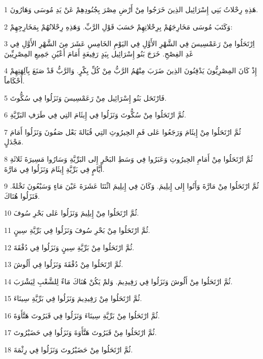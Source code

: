 \par 1 هَذِهِ رِحْلاتُ بَنِي إِسْرَائِيل الذِينَ خَرَجُوا مِنْ أَرْضِ مِصْرَ بِجُنُودِهِمْ عَنْ يَدِ مُوسَى وَهَارُونَ.
\par 2 وَكَتَبَ مُوسَى مَخَارِجَهُمْ بِرِحْلاتِهِمْ حَسَبَ قَوْلِ الرَّبِّ. وَهَذِهِ رِحْلاتُهُمْ بِمَخَارِجِهِمْ:
\par 3 اِرْتَحَلُوا مِنْ رَعَمْسِيسَ فِي الشَّهْرِ الأَوَّلِ فِي اليَوْمِ الخَامِسِ عَشَرَ مِنَ الشَّهْرِ الأَوَّلِ فِي غَدِ الفِصْحِ. خَرَجَ بَنُو إِسْرَائِيل بِيَدٍ رَفِيعَةٍ أَمَامَ أَعْيُنِ جَمِيعِ المِصْرِيِّينَ
\par 4 إِذْ كَانَ المِصْرِيُّونَ يَدْفِنُونَ الذِينَ ضَرَبَ مِنْهُمُ الرَّبُّ مِنْ كُلِّ بِكْرٍ. وَالرَّبُّ قَدْ صَنَعَ بِآلِهَتِهِمْ أَحْكَاماً.
\par 5 فَارْتَحَل بَنُو إِسْرَائِيل مِنْ رَعَمْسِيسَ وَنَزَلُوا فِي سُكُّوتَ.
\par 6 ثُمَّ ارْتَحَلُوا مِنْ سُكُّوتَ وَنَزَلُوا فِي إِيثَامَ التِي فِي طَرَفِ البَرِّيَّةِ.
\par 7 ثُمَّ ارْتَحَلُوا مِنْ إِيثَامَ وَرَجَعُوا عَلى فَمِ الحِيرُوثِ التِي قُبَالةَ بَعْل صَفُونَ وَنَزَلُوا أَمَامَ مَجْدَلٍ.
\par 8 ثُمَّ ارْتَحَلُوا مِنْ أَمَامِ الحِيرُوثِ وَعَبَرُوا فِي وَسَطِ البَحْرِ إِلى البَرِّيَّةِ وَسَارُوا مَسِيرَةَ ثَلاثَةِ أَيَّامٍ فِي بَرِّيَّةِ إِيثَامَ وَنَزَلُوا فِي مَارَّةَ.
\par 9 ثُمَّ ارْتَحَلُوا مِنْ مَارَّةَ وَأَتُوا إِلى إِيلِيمَ. وَكَانَ فِي إِيلِيمَ اثْنَتَا عَشَرَةَ عَيْنَ مَاءٍ وَسَبْعُونَ نَخْلةً. فَنَزَلُوا هُنَاكَ.
\par 10 ثُمَّ ارْتَحَلُوا مِنْ إِيلِيمَ وَنَزَلُوا عَلى بَحْرِ سُوفَ.
\par 11 ثُمَّ ارْتَحَلُوا مِنْ بَحْرِ سُوفَ وَنَزَلُوا فِي بَرِّيَّةِ سِينٍ.
\par 12 ثُمَّ ارْتَحَلُوا مِنْ بَرِّيَّةِ سِينٍ وَنَزَلُوا فِي دُفْقَةَ.
\par 13 ثُمَّ ارْتَحَلُوا مِنْ دُفْقَةَ وَنَزَلُوا فِي أَلُوشَ.
\par 14 ثُمَّ ارْتَحَلُوا مِنْ أَلُوشَ وَنَزَلُوا فِي رَفِيدِيمَ. وَلمْ يَكُنْ هُنَاكَ مَاءٌ لِلشَّعْبِ لِيَشْرَبَ.
\par 15 ثُمَّ ارْتَحَلُوا مِنْ رَفِيدِيمَ وَنَزَلُوا فِي بَرِّيَّةِ سِينَاءَ.
\par 16 ثُمَّ ارْتَحَلُوا مِنْ بَرِّيَّةِ سِينَاءَ وَنَزَلُوا فِي قَبَرُوتَ هَتَّأَوَةَ.
\par 17 ثُمَّ ارْتَحَلُوا مِنْ قَبَرُوتَ هَتَّأَوَةَ وَنَزَلُوا فِي حَضَيْرُوتَ.
\par 18 ثُمَّ ارْتَحَلُوا مِنْ حَضَيْرُوتَ وَنَزَلُوا فِي رِثْمَةَ.

